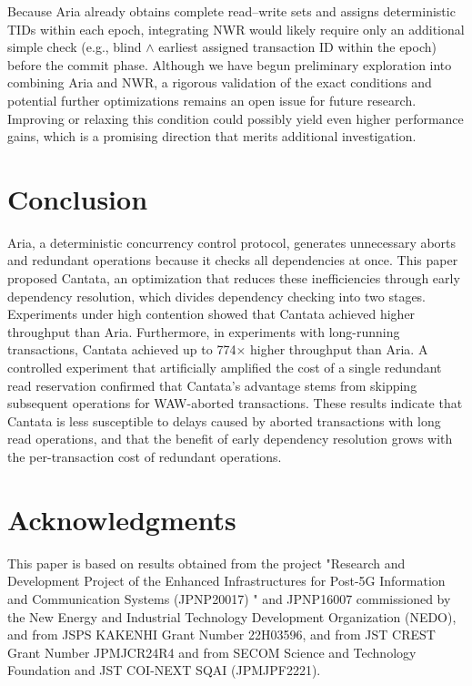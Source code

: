 \documentclass[english,preprint,JIP]{ipsj}
\begin{document}
Because Aria already obtains complete read–write sets and assigns deterministic TIDs within each epoch, integrating NWR would likely require only an additional simple check (e.g., blind $\land$ earliest assigned transaction ID within the epoch) before the commit phase.
Although we have begun preliminary exploration into combining Aria and NWR, a rigorous validation of the exact conditions and potential further optimizations remains an open issue for future research. Improving or relaxing this condition could possibly yield even higher performance gains, which is a promising direction that merits additional investigation.



\section{Conclusion}
Aria, a deterministic concurrency control protocol, generates unnecessary aborts and redundant operations because it checks all dependencies at once. This paper proposed Cantata, an optimization that reduces these inefficiencies through early dependency resolution, which divides dependency checking into two stages. Experiments under high contention showed that Cantata achieved higher throughput than Aria. Furthermore, in experiments with long-running transactions, Cantata achieved up to 774$\times$ higher throughput than Aria. A controlled experiment that artificially amplified the cost of a single redundant read reservation confirmed that Cantata's advantage stems from skipping subsequent operations for WAW-aborted transactions. These results indicate that Cantata is less susceptible to delays caused by aborted transactions with long read operations, and that the benefit of early dependency resolution grows with the per-transaction cost of redundant operations.

\section*{Acknowledgments}
This paper is based on results obtained from the project "Research and Development Project of the
Enhanced Infrastructures for Post-5G Information and Communication Systems (JPNP20017) " and
JPNP16007 commissioned by the New Energy and Industrial Technology Development Organization
(NEDO), and from JSPS KAKENHI Grant Number 22H03596, and from JST CREST Grant Number JPMJCR24R4 and from SECOM Science and Technology Foundation and JST COI-NEXT SQAI (JPMJPF2221).

\def\newblock{\hskip .11em plus .33em minus .07em}


\end{document}
